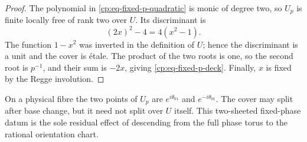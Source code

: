 \begin{proof}
The polynomial in \eqref{cp:eq-fixed-p-quadratic} is monic of degree two, so
\(U_p\) is finite locally free of rank two over \(U\).  Its discriminant is
\begin{equation}
 (2x)^2-4=4(x^2-1).
 \label{cp:eq-fixed-p-discriminant}
\end{equation}
The function \(1-x^2\) was inverted in the definition of \(U\); hence the
discriminant is a unit and the cover is \'etale.  The product of
the two roots is one, so the second root is \(p^{-1}\), and their sum is
\(-2x\), giving \eqref{cp:eq-fixed-p-deck}.  Finally, \(x\) is fixed by the
Regge involution.
\end{proof}

On a physical fibre the two points of \(U_p\) are
\(e^{i\theta_{01}}\) and \(e^{-i\theta_{01}}\).  The cover may split after
base change, but it need not split over \(U\) itself.  This two-sheeted
fixed-phase datum is the sole residual effect of descending from the full
phase torus to the rational orientation chart.
